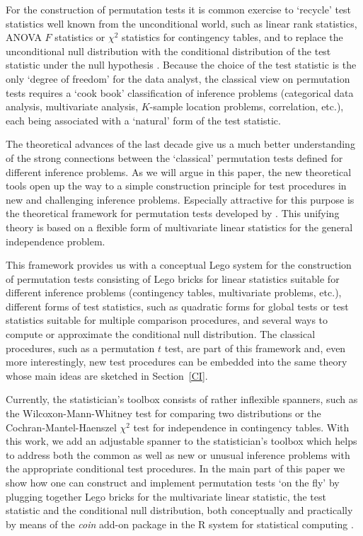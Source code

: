 \documentclass{article}
\newcommand{\Rpackage}[1]{\textit{#1}}
\newcommand{\RR}{\textsf{R}}
\begin{document}
For the construction of permutation tests it is common exercise to `recycle'
test statistics well known from the unconditional world, such as linear rank
statistics, ANOVA $F$ statistics or $\chi^2$ statistics for
contingency tables, and to replace the unconditional null distribution with
the conditional distribution of the test statistic under the null
hypothesis \citep{Edgington1987,Good2000,Pesarin2001,Ernst2004}. 
Because the choice of the test statistic is the only `degree of freedom' for
the data analyst,
the classical view on permutation tests requires 
a `cook book' classification of inference problems (categorical data
analysis, multivariate analysis, $K$-sample location problems, correlation,
etc.), each being associated with a `natural' form of the test statistic.

The theoretical advances of the last decade \citep[notably][]{StrasserWeber1999,JanssenPauls2003}
give us a much better understanding of the strong connections between the 
`classical' permutation tests defined for different inference problems. 
As we will argue in this paper, the new
theoretical tools open up the way to a simple construction principle 
for test procedures in new and challenging inference problems.
Especially attractive for this purpose is the theoretical framework for
permutation tests developed by \cite{StrasserWeber1999}. This unifying
theory is based on a flexible form of multivariate linear statistics for the
general independence problem. 

This framework provides us with a conceptual Lego system for the construction
of permutation tests consisting of Lego bricks for linear statistics
suitable for different inference problems (contingency tables, multivariate
problems, etc.), different forms of test statistics, such as quadratic forms
for global tests or test statistics suitable for multiple comparison
procedures, and several ways to compute or approximate the conditional null
distribution. The classical procedures, such as a permutation $t$ test, are part
of this framework and, even more interestingly, new test procedures can be
embedded into the same theory whose main ideas are sketched in
Section~\ref{CI}.

Currently, the statistician's toolbox consists of rather inflexible spanners,
such as the Wilcoxon-Mann-Whitney test for comparing two distributions 
or the Cochran-Mantel-Haenszel $\chi^2$ test for independence in
contingency tables. With this work, we add an adjustable spanner to the 
statistician's toolbox which helps to address both the common as well 
as new or unusual inference problems with the appropriate 
conditional test procedures. In the main part of this paper we show how one can
construct and implement permutation tests `on the fly' by plugging together Lego bricks for
the multivariate linear statistic, the test statistic and the conditional
null distribution, both conceptually and practically by means of the 
\Rpackage{coin} add-on package 
 \citep{PKG:coina} in the \RR{} system for statistical computing
\citep{Rcore2005}.
\end{document}
